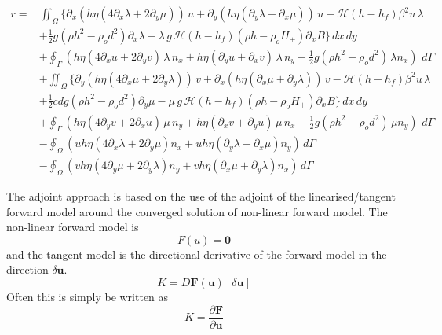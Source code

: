 \documentclass[10pt,a4paper]{book}
\newcommand{\He}{\mathcal{H}}
\newcommand{\p}{\partial}
\begin{document}
\begin{align} 
r=& \iint_{\Omega} \big \{ \p_x ( h \eta ( 4 \p_x \lambda + 2 \p_y \mu ))  \, u +  \p_y ( h \eta (\p_y \lambda + \p_x \mu)) \, u - \He(h-h_f) \beta^2 u \, \lambda \nonumber \\
  &+ \frac{1}{2} g (\rho h^2 - \rho_o d^2) \p_x \lambda   - \lambda \, g\,\He(h-h_f) (\rho h -\rho_o H_{+}) \p_x B \big \}  \, dx \, dy \nonumber \\
  &+ \oint_{\Gamma} (h \eta ( 4\p_x u + 2 \p_y v) \, \lambda \, n_x+  h \eta (\p_y u + \p_x v) \, \lambda \, n_y- \frac{1}{2} g (\rho h^2 - \rho_o d^2) \, \lambda n_x)\,\, d\Gamma \nonumber \\
  &+\iint_{\Omega} \big \{  \p_y ( h \eta ( 4 \p_x \mu + 2 \p_y \lambda )) \, v +   \p_x ( h \eta (\p_x \mu + \p_y \lambda)) \, v - \He(h-h_f) \beta^2 u \, \lambda \nonumber \\
  &+ \frac{1}{2} cdg (\rho h^2 - \rho_o d^2) \p_y \mu   - \mu \, g\,\He(h-h_f) (\rho h -\rho_o H_{+}) \p_x B \big \} \, dx \, dy \nonumber \\
  &+ \oint_{\Gamma} (h \eta ( 4\p_y v + 2 \p_x u) \, \mu \, n_y +  h \eta (\p_x v + \p_y u) \, \mu \, n_x- \frac{1}{2} g (\rho h^2 - \rho_o d^2) \, \mu n_y )\, \, d\Gamma \nonumber \\
  &-\oint_{\Omega} (u h \eta ( 4 \p_x \lambda + 2 \p_y \mu )  n_x +  u  h \eta (\p_y \lambda + \p_x \mu) n_y )\,d\Gamma \nonumber \\
  &-\oint_{\Omega} (v h \eta ( 4 \p_y \mu + 2 \p_y \lambda )  n_y +  v  h \eta (\p_x \mu + \p_y \lambda)  n_x )\, d\Gamma \nonumber 
\end{align}

The adjoint approach is based on the use of the adjoint of the
linearised/tangent forward model around the converged solution of non-linear
forward model.  The non-linear forward model is 
\[ F(u)=\bm{0} \] and the tangent model is the directional
derivative of the forward model in the direction $\delta \bm{u}$.
\[
K=D \bm{F}(\bm{u})[\delta \bm{u}]
\]
Often this is simply be written as
\[
K=\frac{\p \bm{F}}{\p {\bm{u}}}
\]
\end{document}
